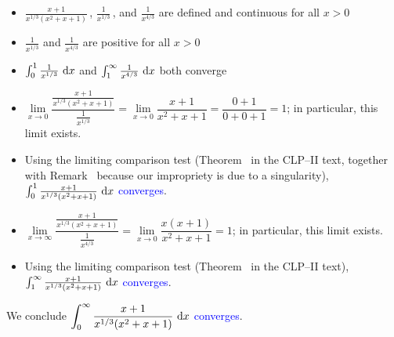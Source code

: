 \begin{solution}
\begin{itemize}
\item $\frac{x+1}{x^{1/3}(x^2+x+1)}$\,, $\frac{1}{x^{1/3}}$\,, and $\frac{1}{x^{4/3}}$ are defined and continuous for all $x > 0$
\item $\frac{1}{x^{1/3}}$ and $\frac{1}{x^{4/3}}$ are positive for all $x>0$
\item $\int_0^1  \frac{1}{x^{1/3}}~\mathrm{d}x$ and $\int_1^\infty  \frac{1}{x^{4/3}}~\mathrm{d}x$ both converge
\item $\lim\limits_{x \to 0}\dfrac{\frac{x+1}{x^{1/3}(x^2+x+1)}}{\frac{1}{x^{1/3}}}
=\lim\limits_{x \to 0}\dfrac{x+1}{x^2+x+1}=\dfrac{0+1}{0+0+1}=1
$; in particular, this limit exists.
\item Using the limiting comparison test (Theorem~
 in the CLP--II text, together with Remark~ because our impropriety is due to a singularity), \textcolor{blue}{
$\int_0^1 \frac{x+1}{x^{1/3}(x^2+x+1)}~\mathrm{d}x$ converges}.
\item $\lim\limits_{x \to \infty}\dfrac{\frac{x+1}{x^{1/3}(x^2+x+1)}}{\frac{1}{x^{4/3}}}
=\lim\limits_{x \to 0}\dfrac{x(x+1)}{x^2+x+1}=1
$; in particular, this limit exists.
\item Using the limiting comparison test (Theorem~
 in the CLP--II text), \textcolor{blue}{
$\int_1^\infty \frac{x+1}{x^{1/3}(x^2+x+1)}~\mathrm{d}x$ converges}.
\end{itemize}

We conclude \textcolor{blue}{
$\displaystyle\int_0^\infty \frac{x+1}{x^{1/3}(x^2+x+1)}~\mathrm{d}x$ converges}.
\end{solution}



\subsection*{\Application}

